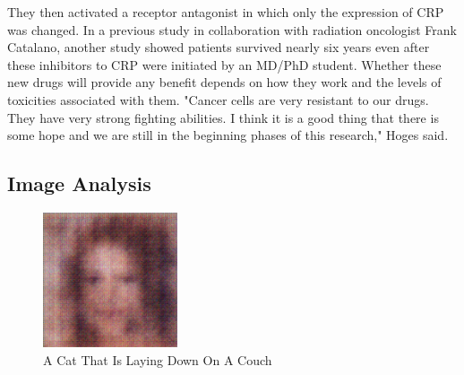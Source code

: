 \documentclass{article}%
\begin{document}
They then activated a receptor antagonist in which only the expression of CRP was changed.\newline%
In a previous study in collaboration with radiation oncologist Frank Catalano, another study showed patients survived nearly six years even after these inhibitors to CRP were initiated by an MD/PhD student.\newline%
Whether these new drugs will provide any benefit depends on how they work and the levels of toxicities associated with them.\newline%
"Cancer cells are very resistant to our drugs. They have very strong fighting abilities. I think it is a good thing that there is some hope and we are still in the beginning phases of this research," Hoges said.

%
\subsection{Image Analysis}%
\label{subsec:ImageAnalysis}%


\begin{figure}[h!]%
\centering%
\includegraphics[width=150px]{500_fake_images/samples_5_395.png}%
\caption{A Cat That Is Laying Down On A Couch}%
\end{figure}

%
\end{document}
